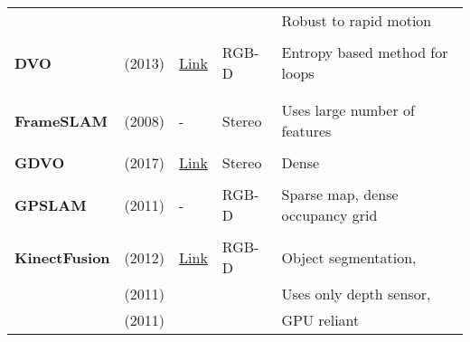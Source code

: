 {\begin{longtable}{l|l|l|l|l}
			&                                   &                                                                    &                       & Robust to rapid motion\\
			&                                   &                                                                    &                       &\\
			\textbf{DVO}           & \cite{Kerl2013} (2013)            & {\href{https://github.com/tum-vision/dvo_slam}{Link}}              & RGB-D                 & Entropy based method for loops\\
			&                                   &                                                                    &                       &\\
			&                                   &                                                                    &                       &\\
			\textbf{FrameSLAM}     & \cite{Konolige2008} (2008)        & -                                                                  & Stereo                & Uses large number of features\\
			&                                   &                                                                    &                       &\\
			\textbf{GDVO}          & \cite{Zhu2017} (2017)             & {\href{https://github.com/syywh/gdvo}{Link}}                       & Stereo                & Dense\\
			&                                   &                                                                    &                       &\\
			\textbf{GPSLAM}        & \cite{Pirker2011a} (2011)         & -                                                                  & RGB-D                 & Sparse map, dense occupancy grid\\
			&                                   &                                                                    &                       &\\
			\textbf{KinectFusion}  & \cite{Pirovano2012} (2012)        & {\href{https://github.com/PointCloudLibrary/pcl}{Link}}            & RGB-D                 & Object segmentation,\\
			& \cite{Izadi2011} (2011)           &                                                                    &                       & Uses only depth sensor,\\
			& \cite{Newcombe2011a} (2011)       &                                                                    &                       & GPU reliant\\

\end{longtable}}
